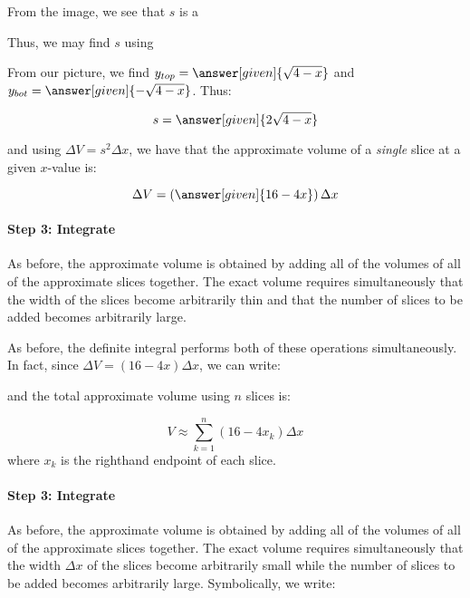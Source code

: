 \documentclass{ximera}
\begin{document}
\begin{model}
\begin{image}
\end{image}

From the image, we see that $s$ is a 

Thus, we may find $s$ using 

From our picture, we find $y_{top} = \answer[given]{\sqrt{4-x}}$ and $y_{bot} = \answer[given]{-\sqrt{4-x}}$.  Thus:

\[
s = \answer[given]{2\sqrt{4-x}}
\]

and using $\Delta V = s^2 \Delta x$, we have that the approximate volume of a \emph{single} slice at a given $x$-value is:

\[
\Delta V = \left(\answer[given]{16-4x}\right) \Delta x
\]

\paragraph{Step 3: Integrate}
As before, the approximate volume is obtained by adding all of the volumes of all of the approximate slices together.  The exact volume requires simultaneously that the width of the slices become arbitrarily thin and that the number of slices to be added becomes arbitrarily large.

As before, the definite integral performs both of these operations simultaneously.  In fact, since $\Delta V = (16-4x) \Delta x$, we can write:

and the total approximate volume using $n$ slices is:

\[
V \approx  \sum_{k=1}^n (16-4x_k) \Delta x
\]
where $x_k$ is the righthand endpoint of each slice.

\paragraph{Step 3: Integrate}
As before, the approximate volume is obtained by adding all of the volumes of all of the approximate slices together.  The exact volume requires simultaneously that the width $\Delta x$ of the slices become arbitrarily small while the number of slices to be added becomes arbitrarily large.  Symbolically, we write:


\end{model}
\end{document}
